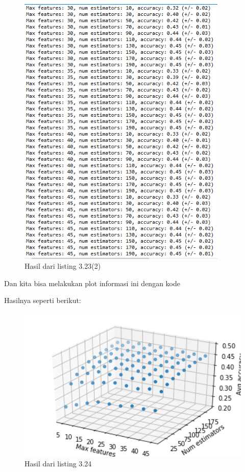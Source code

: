 \begin{figure}[H]
	\centering
	\includegraphics[width=10cm]{figures/1174075/3/32a.png}
	\caption{Hasil dari listing 3.23(2)}
\end{figure}


Dan kita bisa melakukan plot informasi ini dengan kode

Hasilnya seperti berikut:
\begin{figure}[H]
	\centering
	\includegraphics[width=12cm]{figures/1174075/3/33.png}
	\caption{Hasil dari listing 3.24}
\end{figure}


